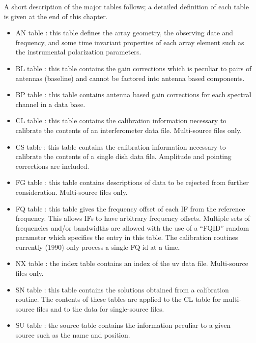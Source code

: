 A short description of the major tables follows; a detailed definition
of each table is given at the end of this chapter.
\begin{itemize} %
\item {}
AN table : this table defines the array geometry, the observing date
and frequency, and some time invariant properties of each array
element such as the instrumental polarization parameters.
\item BL table : this table contains the gain corrections which is
peculiar to pairs of antennas (baseline) and cannot be factored into
antenna based components.
\item BP table : this table contains antenna based gain corrections
for each spectral channel in a data base.
\item CL table : this table contains the calibration information necessary
to calibrate the contents of an interferometer data file. Multi-source
files only.
\item CS table : this table contains the calibration information necessary
to calibrate the contents of a single dish data file.  Amplitude and
pointing corrections are included.
\item FG table : this table contains descriptions of data to be rejected
from further consideration. Multi-source files only.
\item FQ table : this table gives the frequency offset of each IF from the
reference frequency.  This allows IFs to have arbitrary frequency
offsets.  Multiple sets of frequencies and/or bandwidths are allowed
with the use of a ``FQID'' random parameter which specifies the entry
in this table.  The calibration routines currently (1990) only process
a single FQ id at a time.
\item NX table : the index table contains an index of the uv data file.
Multi-source files only.
\item SN table : this table contains the solutions obtained from a
calibration routine.  The contents of these tables are applied to the
CL table for multi-source files and to the data for single-source
files.
\item SU table : the source table contains the information peculiar to a
given source such as the name and position.

\end{itemize} %

